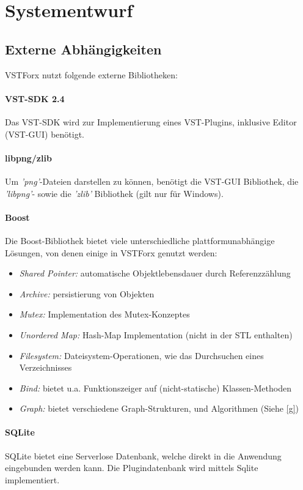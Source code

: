 \section{Systementwurf}
\subsection{Externe Abhängigkeiten}
VSTForx nutzt folgende externe Bibliotheken:
\paragraph{VST-SDK 2.4}
Das VST-SDK wird zur Implementierung eines VST-Plugins, inklusive Editor (VST-GUI) benötigt.
\paragraph{libpng/zlib}
Um \emph{'png'}-Dateien darstellen zu können, benötigt die VST-GUI Bibliothek, die \emph{'libpng'}- sowie die \emph{'zlib'} Bibliothek (gilt nur für Windows). 
\paragraph{Boost}
	Die Boost-Bibliothek bietet viele unterschiedliche plattformunabhängige Lösungen, von denen einige in VSTForx genutzt werden:  
	\begin {itemize}
		\item \emph{Shared Pointer:} automatische Objektlebensdauer durch Referenzzählung
		\item \emph{Archive:} persistierung von Objekten 
		\item \emph{Mutex:} Implementation des Mutex-Konzeptes
		\item \emph{Unordered Map:} Hash-Map Implementation (nicht in der STL enthalten)
		\item \emph{Filesystem:} Dateisystem-Operationen, wie das Durchsuchen eines Verzeichnisses
		\item \emph{Bind:} bietet u.a. Funktionszeiger auf (nicht-statische) Klassen-Methoden
		\item \emph{Graph: } bietet verschiedene Graph-Strukturen, und Algorithmen (Siehe \ref{g})  
	\end {itemize}
\paragraph{SQLite}
SQLite bietet eine Serverlose Datenbank, welche direkt in die Anwendung eingebunden werden kann. Die Plugindatenbank wird mittels Sqlite implementiert.
